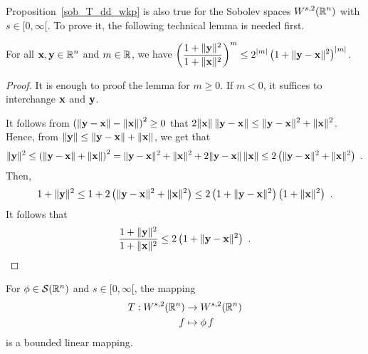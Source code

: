 Proposition~\ref{sob_T_dd_wkp} is also true for the Sobolev spaces
$\displaystyle W^{s,2}(\mathbb{R}^n)$ with $s\in [0,\infty[$.  To prove it, the
following technical lemma is needed first.

\begin{lemma} \label{sob_tri_equ}
For all $\displaystyle \mathbf{x}, \mathbf{y} \in \mathbb{R}^n$ and $m \in \mathbb{R}$, we have
$\displaystyle \left(\frac{1+\|\mathbf{y}\|^2}{1+\|\mathbf{x}\|^2} \right)^m
\leq 2^{|m|} \left(1+\|\mathbf{y}-\mathbf{x}\|^2\right)^{|m|}$.
\end{lemma}

\begin{proof}
It is enough to proof the lemma for $m\geq 0$.  If $m<0$, it suffices
to interchange $\mathbf{x}$ and $\mathbf{y}$.

It follows from
$\displaystyle \left(\|\mathbf{y} - \mathbf{x}\| - \|\mathbf{x}\|\right)^2 \geq 0$
that $\displaystyle 2\|\mathbf{x}\|\,\|\mathbf{y}-\mathbf{x}\|
\leq \|\mathbf{y} - \mathbf{x}\|^2 + \|\mathbf{x}\|^2$.  Hence, from
$\displaystyle \|\mathbf{y}\| \leq \|\mathbf{y}-\mathbf{x}\| +\|\mathbf{x}\|$, we
get that
\[
\|\mathbf{y}\|^2 \leq \left( \|\mathbf{y}-\mathbf{x}\| +\|\mathbf{x}\| \right)^2
= \|\mathbf{y}-\mathbf{x}\|^2 +\|\mathbf{x}\|^2 +2 \|\mathbf{y}-\mathbf{x}\|\,\|\mathbf{x}\|
\leq 2\left( \|\mathbf{y}-\mathbf{x}\|^2 +\|\mathbf{x}\|^2 \right) \ .
\]
Then,
\[
1+\|\mathbf{y}\|^2 \leq 1 + 2\left( \|\mathbf{y}-\mathbf{x}\|^2 +\|\mathbf{x}\|^2 \right)
\leq 2 \left(1+\|\mathbf{y}-\mathbf{x}\|^2\right)\left(1+\|\mathbf{x}\|^2\right) \ .
\]
It follows that
\[
\frac{1+\|\mathbf{y}\|^2}{1+\|\mathbf{x}\|^2}
\leq 2 \left(1+\|\mathbf{y}-\mathbf{x}\|^2\right) \ .  \qedhere
\]
\end{proof}

\begin{prop} \label{sob_T_dd_wk2}
For $\phi \in \mathcal{S}(\mathbb{R}^n)$ and $s\in [0,\infty[$, the mapping
\begin{align*}
T: W^{s,2}(\mathbb{R}^n) &\rightarrow W^{s,2}(\mathbb{R}^n) \\
f &\mapsto \phi \,f 
\end{align*}
is a bounded linear mapping.
\end{prop}

